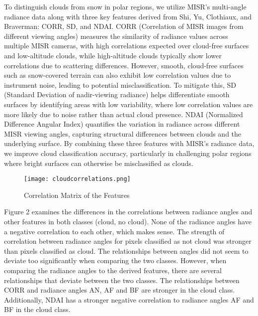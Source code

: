 \documentclass[11pt,letterpaper]{article}
\begin{document}
To distinguish clouds from snow in polar regions, we utilize MISR’s multi-angle radiance data along with three key features derived from Shi, Yu, Clothiaux, and Braverman: CORR, SD, and NDAI. CORR (Correlation of MISR images from different viewing angles) measures the similarity of radiance values across multiple MISR cameras, with high correlations expected over cloud-free surfaces and low-altitude clouds, while high-altitude clouds typically show lower correlations due to scattering differences. However, smooth, cloud-free surfaces such as snow-covered terrain can also exhibit low correlation values due to instrument noise, leading to potential misclassification. To mitigate this, SD (Standard Deviation of nadir-viewing radiance) helps differentiate smooth surfaces by identifying areas with low variability, where low correlation values are more likely due to noise rather than actual cloud presence. NDAI (Normalized Difference Angular Index) quantifies the variation in radiance across different MISR viewing angles, capturing structural differences between clouds and the underlying surface. By combining these three features with MISR’s radiance data, we improve cloud classification accuracy, particularly in challenging polar regions where bright surfaces can otherwise be misclassified as clouds.

\begin{figure}[H]
    \centering
    \texttt{[image: cloudcorrelations.png]}
    \caption{Correlation Matrix of the Features}
    \label{fig:enter-label}
\end{figure}

Figure 2 examines the differences in the correlations between radiance angles and other features in both classes (cloud, no cloud). None of the radiance angles have a negative correlation to each other, which makes sense. The strength of correlation between radiance angles for pixels classified as not cloud was stronger than pixels classified as cloud. The relationships between angles did not seem to deviate too significantly when comparing the two classes. However, when comparing the radiance angles to the derived features, there are several relationships that deviate between the two classes. The relationships between CORR and radiance angles AN, AF and BF are stronger in the cloud class. Additionally, NDAI has a stronger negative correlation to radiance angles AF and BF in the cloud class. 
\end{document}
